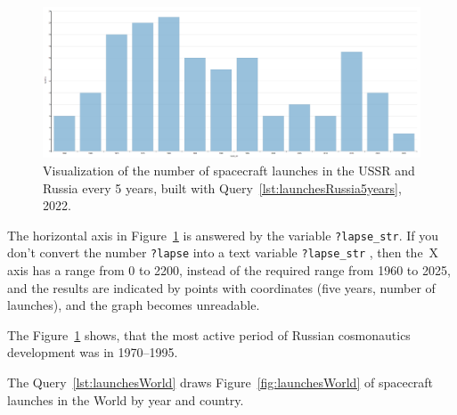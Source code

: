 \begin{figure}[h!]
  \includegraphics[width=\linewidth]{graphics/chapter/spacecraft/Visualization of the number of spacecraft launches in USSR and Russia per 5 years 2022.png}
  \caption[Schedule of spacecraft launches in the USSR and Russia (by five years)] {Visualization of the number of spacecraft launches in the USSR and Russia every 5 years, built with Query~\protect\ref{lst:launchesRussia5years}, 2022.}%
  \label{fig:launchesRussia5years}%
\end{figure}

The horizontal axis in Figure~\ref{fig:launchesRussia5years} is answered by the variable \mbox{\lstinline|?lapse_str|}. 
If you don't convert the number \lstinline|?lapse| 
into a text variable \mbox{\lstinline|?lapse_str|}%
, then the~X axis has a range from 0 to 2200, 
instead of the required range from 1960 to 2025, 
and the results are indicated by points with coordinates (five years, number of launches), 
and the graph becomes unreadable. 

The Figure~\ref{fig:launchesRussia5years} shows, 
that the most active period of Russian cosmonautics development was in 1970--1995.

The Query~\ref{lst:launchesWorld} draws Figure~\ref{fig:launchesWorld} 
of spacecraft launches in the World by year and country.

